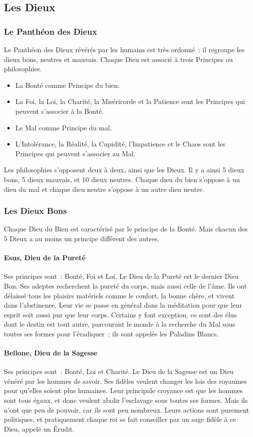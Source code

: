 \documentclass[a4paper,10pt,openany]{book}
\begin{document}
\begin{multicols}{2}
\subsection{Les Dieux}

\subsubsection{Le Panthéon des Dieux}
Le Panthéon des Dieux révérés par les humains est très ordonné : il regroupe les dieux bons, neutres et mauvais. Chaque Dieu est associé à trois
Principes ou philosophies.
\begin{itemize}
  \item La Bonté comme Principe du bien.
  \item La Foi, la Loi, la Charité, la Miséricorde et la Patience sont les Principes qui peuvent s’associer à la Bonté.
  \item Le Mal comme Principe du mal.
  \item L’Intolérance, la Réalité, la Cupidité, l’Impatience et le Chaos sont les Principes qui peuvent s’associer au Mal.
\end{itemize}
Les philosophies s’opposent deux à deux, ainsi que les Dieux. Il y a ainsi 5 dieux bons, 5 dieux mauvais, et 10 dieux neutres. Chaque dieu du bien
s’oppose à un dieu du mal et chaque dieu neutre s’oppose à un autre dieu neutre.

\subsubsection{Les Dieux Bons}
Chaque Dieu du Bien est caractérisé par le principe de la Bonté. Mais chacun des 5 Dieux a au moins un principe différent des autres.
\paragraph{Esus, Dieu de la Pureté}
Ses principes sont : Bonté, Foi et Loi. Le Dieu de la Pureté est le dernier Dieu Bon. Ses adeptes recherchent la pureté du corps, mais aussi celle de
l’âme. Ils ont délaissé tous les plaisirs matériels comme le confort, la bonne chère, et vivent dans l’abstinence. Leur vie se passe en général dans
la méditation pour que leur esprit soit aussi pur que leur corps. Certains y font exception, ce sont des élus dont le destin est tout autre,
parcourant le monde à la recherche du Mal sous toutes ses formes pour l’éradiquer : ils sont appelés les Paladins Blancs.
\paragraph{Bellone, Dieu de la Sagesse}
Ses principes sont : Bonté, Loi et Charité. Le Dieu de la Sagesse est un Dieu vénéré par les hommes de savoir. Ses fidèles veulent changer les lois
des royaumes pour qu’elles soient plus humaines. Leur principale croyance est que les hommes sont tous égaux, et donc veulent abolir l’esclavage sous
toutes ses formes. Mais ils n’ont que peu de pouvoir, car ils sont peu nombreux. Leurs actions sont purement politiques, et pratiquement chaque roi se
fait conseiller par un sage fidèle à ce Dieu, appelé un Érudit.

\end{multicols}
\end{document}
